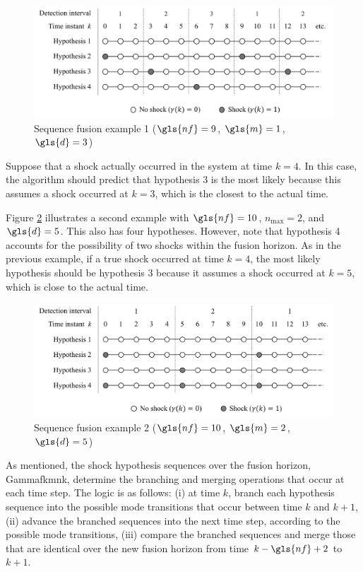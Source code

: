 \begin{figure}[ht]
	\centering
	\includegraphics[width=13.5cm]{images/mm_obs_seq_rob1.pdf}
	\caption{Sequence fusion example 1 ($\gls{nf}=9$, $\gls{m}=1$, $\gls{d}=3$)}
	\label{fig:mm-obs-seq-SFex1}
\end{figure}

Suppose that a shock actually occurred in the system at time $k=4$. In this case, the algorithm should predict that hypothesis 3 is the most likely because this assumes a shock occurred at $k=3$, which is the closest to the actual time.

Figure \ref{fig:mm-obs-seq-SFex2} illustrates a second example with $\gls{nf}=10$, $n_\text{max}=2$, and $\gls{d}=5$. This also has four hypotheses. However, note that hypothesis 4 accounts for the possibility of two shocks within the fusion horizon. As in the previous example, if a true shock occurred at time $k=4$, the most likely hypothesis should be hypothesis 3 because it assumes a shock occurred at $k=5$, which is close to the actual time.

\begin{figure}[ht]
	\centering
	\includegraphics[width=13.5cm]{images/mm_obs_seq_rob2.pdf}
	\caption{Sequence fusion example 2 ($\gls{nf}=10$, $\gls{m}=2$, $\gls{d}=5$)}
	\label{fig:mm-obs-seq-SFex2}
\end{figure}

As mentioned, the shock hypothesis sequences over the fusion horizon, \gls{Gammafkmnk}, determine the branching and merging operations that occur at each time step. The logic is as follows: (i) at time $k$, branch each hypothesis sequence into the possible mode transitions that occur between time $k$ and $k+1$, (ii) advance the branched sequences into the next time step, according to the possible mode transitions, (iii) compare the branched sequences and merge those that are identical over the new fusion horizon from time $k-\gls{nf}+2$ to $k+1$.

